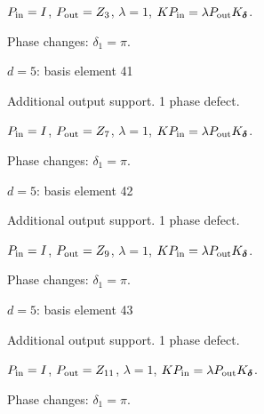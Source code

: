 $P_{\rm in}=I$, \quad $P_{\rm out}=Z_{3}$, \quad $\lambda=1$, \qquad $K P_{\rm in}=\lambda P_{\rm out}K_{\boldsymbol\delta}$.
\par\smallskip\begin{minipage}{.98\linewidth}\small Phase changes: $\delta_{1}=\pi$.\end{minipage}
\vfill
{\footnotesize\texttt{}}
\newpage
{}
{\Large $d=5$: basis element 41}\par
Additional output support. 1 phase defect.
\begin{center}
\end{center}
\vspace{-1mm}
$P_{\rm in}=I$, \quad $P_{\rm out}=Z_{7}$, \quad $\lambda=1$, \qquad $K P_{\rm in}=\lambda P_{\rm out}K_{\boldsymbol\delta}$.
\par\smallskip\begin{minipage}{.98\linewidth}\small Phase changes: $\delta_{1}=\pi$.\end{minipage}
\vfill
{\footnotesize\texttt{}}
\newpage
{}
{\Large $d=5$: basis element 42}\par
Additional output support. 1 phase defect.
\begin{center}
\end{center}
\vspace{-1mm}
$P_{\rm in}=I$, \quad $P_{\rm out}=Z_{9}$, \quad $\lambda=1$, \qquad $K P_{\rm in}=\lambda P_{\rm out}K_{\boldsymbol\delta}$.
\par\smallskip\begin{minipage}{.98\linewidth}\small Phase changes: $\delta_{1}=\pi$.\end{minipage}
\vfill
{\footnotesize\texttt{}}
\newpage
{}
{\Large $d=5$: basis element 43}\par
Additional output support. 1 phase defect.
\begin{center}
\end{center}
\vspace{-1mm}
$P_{\rm in}=I$, \quad $P_{\rm out}=Z_{11}$, \quad $\lambda=1$, \qquad $K P_{\rm in}=\lambda P_{\rm out}K_{\boldsymbol\delta}$.
\par\smallskip\begin{minipage}{.98\linewidth}\small Phase changes: $\delta_{1}=\pi$.\end{minipage}
